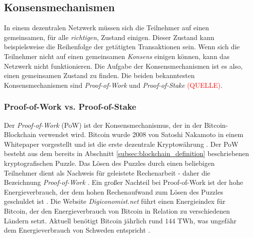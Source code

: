 \subsection{Konsensmechanismen}

In einem dezentralen Netzwerk müssen sich die Teilnehmer auf einen gemeinsamen, für alle \textit{richtigen}, Zustand einigen. Dieser Zustand kann beispielsweise die Reihenfolge der getätigten Transaktionen sein. Wenn sich die Teilnehmer nicht auf einen gemeinsamen \textit{Konsens} einigen können, kann das Netzwerk nicht funktionieren. Die Aufgabe der Konsensmechanismen ist es also, einen gemeinsamen Zustand zu finden. Die beiden bekanntesten Konsensmechanismen sind \textit{Proof-of-Work} und \textit{Proof-of-Stake} \textcolor{red}{(QUELLE)}.

\subsubsection{Proof-of-Work vs. Proof-of-Stake}

Der \textit{Proof-of-Work} (PoW) ist der Konsensmechanismus, der in der Bitcoin-Blockchain verwendet wird. Bitcoin wurde 2008 von Satoshi Nakamoto in einem Whitepaper vorgestellt und ist die erste dezentrale Kryptowährung \parencites{Nakamoto_Bitcoin}{Zhang_DoubleSpendingWithASybilAttack}. Der PoW besteht aus dem bereits in Abschnitt \ref{subsec:blockchain_definition}  beschriebenen kryptografischen Puzzle. Das Lösen des Puzzles durch einen beliebigen Teilnehmer dient als Nachweis für geleistete Rechenarbeit - daher die Bezeichnung \textit{Proof-of-Work} \parencite[S. 27]{Brünnler_BlockchainKurzGut}. Ein großer Nachteil bei Proof-of-Work ist der hohe Energieverbrauch, der dem hohen Rechenaufwand zum Lösen des Puzzles geschuldet ist \parencite{Zhang_EvaluationOfEnergyConsumptionInBlockChains}. Die Website \textit{Digiconomist.net} führt einen Energieindex für Bitcoin, der den Energieverbrauch von Bitcoin in Relation zu verschiedenen Ländern setzt. Aktuell benötigt Bitcoin jährlich rund $144$ TWh, was ungefähr dem Energieverbrauch von Schweden entspricht \parencite{Digiconomist_BitcoinEnergyConsumption}.


